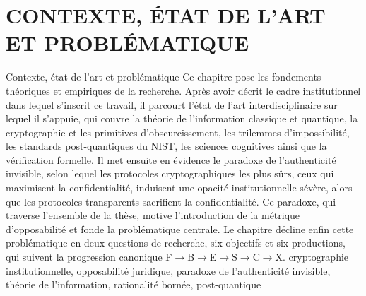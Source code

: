 \documentclass[a4paper,11pt,reqno,oneside]{memoir}
\begin{document}
\chapter{CONTEXTE, \'ETAT DE L'ART ET PROBL\'EMATIQUE}
\label{chap:contexte}
\debutChapitre%
   {Contexte, \'etat de l'art et probl\'ematique}%
  {%
    Ce chapitre pose les fondements th\'eoriques et empiriques de la
    recherche. Apr\`es avoir d\'ecrit le cadre institutionnel dans lequel
    s'inscrit ce travail, il parcourt l'\'etat de l'art interdisciplinaire
    sur lequel il s'appuie, qui couvre la th\'eorie de l'information classique
    et quantique, la cryptographie et les primitives d'obscurcissement, les
    trilemmes d'impossibilit\'e, les standards post-quantiques du NIST, les sciences
    cognitives ainsi que la v\'erification formelle. Il met ensuite en
    \'evidence le paradoxe de l'authenticit\'e invisible, selon lequel les
    protocoles cryptographiques les plus s\^urs, ceux qui maximisent la
    confidentialit\'e, induisent une opacit\'e institutionnelle s\'ev\`ere, alors
    que les protocoles transparents sacrifient la confidentialit\'e. Ce paradoxe,
    qui traverse l'ensemble de la th\`ese, motive l'introduction de la
    m\'etrique d'opposabilit\'e et fonde la probl\'ematique centrale. Le chapitre d\'ecline enfin
    cette probl\'ematique en deux questions de recherche, six objectifs et six productions, qui
    suivent la progression canonique F$\to$B$\to$E$\to$S$\to$C$\to$X.%
  }%
  {%
    cryptographie institutionnelle, opposabilit\'e juridique, paradoxe de
    l'authenticit\'e invisible, th\'eorie de l'information, rationalit\'e
    born\'ee, post-quantique%
  }%







\end{document}
